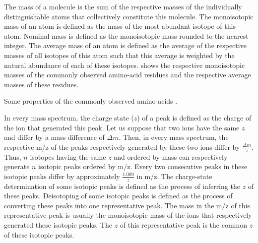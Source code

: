The mass of a molecule is the sum of the respective masses of the individually distinguishable atoms that collectively constitute this molecule.
The monoisotopic mass of an atom is defined as the mass of the most abundant isotope of this atom.
Nominal mass                     is defined as the monoisotopic mass rounded to the nearest integer. 
The average      mass of an atom is defined as the average of the respective masses of all isotopes of this atom 
		such that this average is weighted by the natural abundance of each of these isotopes.
		shows the respective monoisotopic masses of the commonly observed amino-acid residues and the respective average masses of these residues.
\begin{table}
\caption[
	Some properties of the commonly observed amino acids \cite{mascot2014amino}.]{
	Some properties of the commonly observed amino acids \cite{mascot2014amino}.
	\label{tab:fund2:listof-residues-emph-mass}
}
\end{table}

In every mass spectrum, the charge state (\(z\)) of a peak is defined as the charge of the ion that generated this peak.
Let us suppose that two ions have the same \(z\) and differ by a mass difference of \(\Delta{}m\).
Then, in every mass spectrum, the respective \gls{m/z} of the peaks respectively generated by these two ions differ by \(\frac{\Delta{}m}{z}\).
Thus, \(n\) isotopes having the same \(z\) and ordered by mass can respectively generate \(n\) isotopic peaks ordered by \gls{m/z}.
Every two consecutive peaks in these isotopic peaks differ by approximately \(\frac{1.009}{z}\) in \gls{m/z}.
The charge-state determination of some isotopic peaks is defined as the process of inferring the \(z\) of these peaks. 
Deisotoping of some isotopic peaks is defined as the process of converting these peaks into one representative peak. 
The mass in the \gls{m/z} of this representative peak is usually the monoisotopic mass of the ions that respectively generated these isotopic peaks.
The \(z\) of this representative peak is the common \(z\) of these isotopic peaks.

